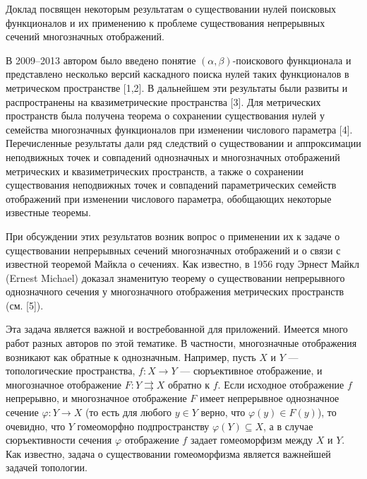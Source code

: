 
\vzmscaption

Доклад посвящен некоторым результатам о существовании нулей поисковых функционалов и их применению к проблеме существования непрерывных сечений многозначных отображений.

В 2009--2013 автором было введено понятие  $(\alpha,\beta)$-по\-ис\-ко\-во\-го функционала и представлено несколько версий каскадного поиска нулей таких функционалов в метрическом пространстве [1,2]. В дальнейшем эти результаты были развиты и распространены на квазиметрические пространства [3]. Для метрических пространств была получена теорема о сохранении существования нулей у семейства многозначных функционалов при изменении числового параметра [4]. Перечисленные результаты дали ряд следствий о существовании и аппроксимации неподвижных точек и совпадений однозначных и многозначных отображений метрических и квазиметрических пространств, а также о сохранении существования неподвижных точек и совпадений параметрических семейств  отображений при изменении числового параметра, обобщающих некоторые известные теоремы.

При обсуждении этих результатов возник вопрос о применении их к задаче о существовании непрерывных сечений многозначных отображений и о связи с известной теоремой Майкла о сечениях.
Как известно, в  1956 году Эрнест Майкл \foreignlanguage{english}{(Ernest Michael)}
доказал знаменитую теорему о существовании непрерывного однозначного сечения у многозначного отображения метрических пространств (см. [5]).

Эта задача  является важной и востребованной для приложений. Имеется много работ разных авторов по этой тематике. В частности, многозначные отображения возникают как обратные к однозначным. Например, пусть $X$ и $Y$ --- топологические пространства, $f: X\to Y$ --- сюръективное отображение, и многозначное отображение $F: Y\rightrightarrows X$  обратно к $f$. Если исходное отображение $f$ непрерывно, и многозначное отображение $F$ имеет непрерывное однозначное сечение $\varphi: Y\to X$ (то есть для любого $y\in Y$ верно, что $\varphi(y)\in F(y)$), то очевидно, что $Y$ гомеоморфно подпространству $\varphi(Y)\subseteq X$, а в случае сюръективности сечения $\varphi$ отображение $f$ задает гомеоморфизм между $X$ и $Y$. Как известно, задача о существовании гомеоморфизма является важнейшей задачей топологии.

